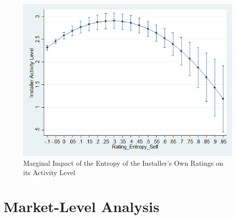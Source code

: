 \documentclass[msom,blindrev]{informs3}
\begin{document}
\begin{figure}
	\centering
	\includegraphics[width=0.7\linewidth]{marginsplot_entself.png}
	\caption{Marginal Impact of the Entropy of the Installer's Own Ratings on its Activity Level}
	\label{fig: marginsplot_ind_ent_self}
\end{figure}









\section{Market-Level Analysis}
\end{document}
